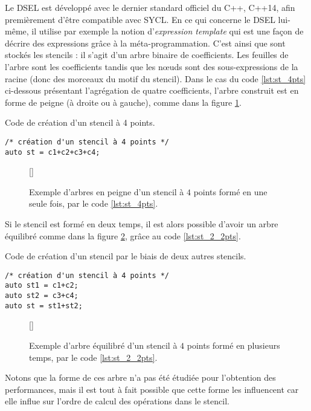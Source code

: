 Le DSEL est développé avec le dernier standard officiel du \textsf{C++}, \textsf{C++14}, afin premièrement d'être compatible avec \textsf{SYCL}. En ce qui concerne le DSEL lui-même, il utilise par exemple la notion d'\emph{expression template} \cite{Web4,Art21} qui est une façon de décrire des expressions grâce à la méta-programmation. C'est ainsi que sont stockés les stencils : il s'agit d'un arbre binaire de coefficients. Les feuilles de l'arbre sont les coefficients tandis que les nœuds sont des sous-expressions de la racine (donc des morceaux du motif du stencil). Dans le cas du code \ref{lst:st_4pts} ci-dessous présentant l'agrégation de quatre coefficients, l'arbre construit est en forme de peigne (à droite ou à gauche), comme dans la figure \ref{fig:tree1_coef}.
\begin{listing}[H]
\caption{Code de création d'un stencil à 4 points.}
\label{lst:st_4pts}
\begin{verbatim}
/* création d'un stencil à 4 points */
auto st = c1+c2+c3+c4; 
\end{verbatim}
\end{listing}
\begin{figure}[!h]
[\FBwidth]
{\caption{Exemple d'arbres en peigne d'un stencil à $4$ points formé en une seule fois, par le code \ref{lst:st_4pts}.}\label{fig:tree1_coef}}
{}
\end{figure}
Si le stencil est formé en deux temps, il est alors possible d'avoir un arbre équilibré comme dans la figure \ref{fig:tree2_coef}, grâce au code \ref{lst:st_2_2pts}.
\begin{listing}[H]
\caption{Code de création d'un stencil par le biais de deux autres stencils.}
\label{lst:st_2_2pts}
\begin{verbatim}
/* création d'un stencil à 4 points */
auto st1 = c1+c2;
auto st2 = c3+c4;
auto st = st1+st2;
\end{verbatim}
\end{listing}
\begin{figure}[!h]
[\FBwidth]
{\caption{Exemple d'arbre équilibré d'un stencil à $4$ points formé en plusieurs temps, par le code \ref{lst:st_2_2pts}.}\label{fig:tree2_coef}}
{}
\end{figure}
Notons que la forme de ces arbre n'a pas été étudiée pour l'obtention des performances, mais il est tout à fait possible que cette forme les influencent car elle influe sur l'ordre de calcul des opérations dans le stencil. 

